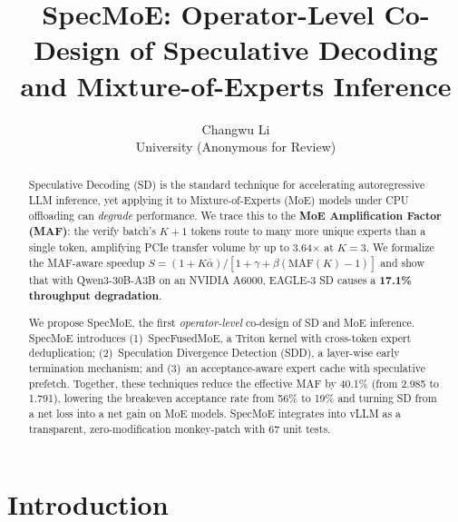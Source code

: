 \documentclass[letterpaper,twocolumn,10pt]{article}
\newcommand{\sysname}{SpecMoE\xspace}
\newcommand{\specfused}{SpecFusedMoE\xspace}
\newcommand{\sdd}{SDD\xspace}
\newcommand{\thetabar}{\bar{\alpha}}
\begin{document}

\date{}

\title{\Large \bf \sysname: Operator-Level Co-Design of Speculative Decoding\\
and Mixture-of-Experts Inference}

\author{
{\rm Changwu Li}\\
University (Anonymous for Review)
}

\maketitle

\begin{abstract}
Speculative Decoding (SD) is the standard technique for accelerating
autoregressive LLM inference, yet applying it to Mixture-of-Experts (MoE)
models under CPU offloading can \emph{degrade} performance.  We trace this
to the \textbf{MoE Amplification Factor (MAF)}: the verify batch's
$K\!+\!1$ tokens route to many more unique experts than a single token,
amplifying PCIe transfer volume by up to 3.64$\times$ at $K\!=\!3$.
We formalize the MAF-aware speedup $S = (1\!+\!K\thetabar) /
[1+\gamma+\beta(\text{MAF}(K)\!-\!1)]$ and show that with
Qwen3-30B-A3B on an NVIDIA A6000, EAGLE-3 SD causes a
\textbf{17.1\% throughput degradation}.

We propose \sysname, the first \emph{operator-level} co-design of SD and
MoE inference.  \sysname introduces (1)~\specfused, a Triton kernel with
cross-token expert deduplication; (2)~Speculation Divergence Detection
(\sdd), a layer-wise early termination mechanism; and (3)~an
acceptance-aware expert cache with speculative prefetch.  Together, these
techniques reduce the effective MAF by 40.1\% (from 2.985 to 1.791),
lowering the breakeven acceptance rate from 56\% to 19\% and turning
SD from a net loss into a net gain on MoE models.  \sysname integrates
into vLLM as a transparent, zero-modification monkey-patch with 67 unit tests.
\end{abstract}

\section{Introduction}\label{sec:intro}
\end{document}
